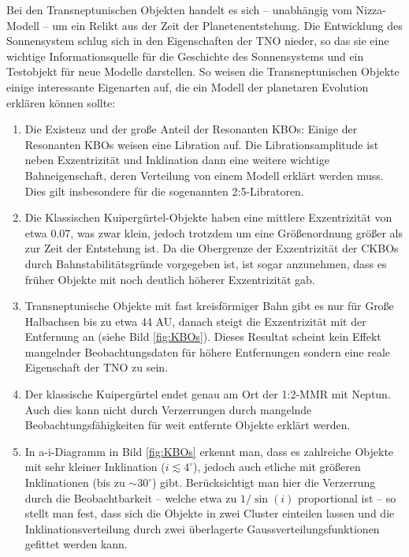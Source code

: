 \documentclass[12pt,a4paper,twoside]{article}
\renewcommand{\cite}{\citep}
\begin{document}
\noindent
Bei den Transneptunischen Objekten handelt es sich -- unabhängig vom Nizza-Modell -- um ein Relikt aus der Zeit der Planetenentstehung. Die Entwicklung des Sonnensystem schlug sich in den Eigenschaften der TNO nieder, so das sie eine wichtige Informationsquelle für die Geschichte des Sonnensystems und ein Testobjekt für neue Modelle darstellen.
So weisen die Transneptunischen Objekte einige interessante Eigenarten auf, die ein Modell der planetaren Evolution erklären können sollte:
\begin{enumerate}
\item Die Existenz und der große Anteil der Resonanten KBOs: Einige der Resonanten KBOs weisen eine Libration auf. Die Librationsamplitude ist neben Exzentrizität und Inklination dann eine weitere wichtige Bahneigenschaft, deren Verteilung von einem Modell erklärt werden muss. Dies gilt insbesondere für die sogenannten 2:5-Libratoren\cite{Levison2008}. %
\item Die Klassischen Kuipergürtel-Objekte haben eine mittlere Exzentrizität von etwa 0.07, was zwar klein, jedoch trotzdem um eine Größenordnung größer als zur Zeit der Entstehung ist. Da die Obergrenze der Exzentrizität der CKBOs durch Bahnstabilitätsgründe vorgegeben ist, ist sogar anzunehmen, dass es früher Objekte mit noch deutlich höherer Exzentrizität gab.
\item Transneptunische Objekte mit fast kreisförmiger Bahn gibt es nur für Große Halbachsen bis zu etwa 44 AU, danach steigt die Exzentrizität mit der Entfernung an (siehe Bild \ref{fig:KBOs})\cite{Levison2008}. Dieses Resultat scheint kein Effekt mangelnder Beobachtungsdaten für höhere Entfernungen sondern eine reale Eigenschaft der TNO zu sein\cite{Levison2008}.
\item Der klassische Kuipergürtel endet genau am Ort der 1:2-MMR mit Neptun\cite{Levison2008}. Auch dies kann nicht durch Verzerrungen durch mangelnde Beobachtungsfähigkeiten für weit entfernte Objekte erklärt werden.
\item In a-i-Diagramm in Bild \ref{fig:KBOs} erkennt man, dass es zahlreiche Objekte mit sehr kleiner Inklination ($i\lesssim 4^\circ$), jedoch auch etliche mit größeren Inklinationen (bis zu $\sim 30^\circ$) gibt. Berücksichtigt man hier die Verzerrung durch die Beobachtbarkeit -- welche etwa zu $1/\sin(i)$ proportional ist -- so stellt man fest, dass sich die Objekte in zwei Cluster einteilen lassen und die Inklinationsverteilung durch zwei überlagerte Gaussverteilungsfunktionen gefittet werden kann\cite{Brown2001,Levison2008}.

\end{enumerate}
\end{document}
